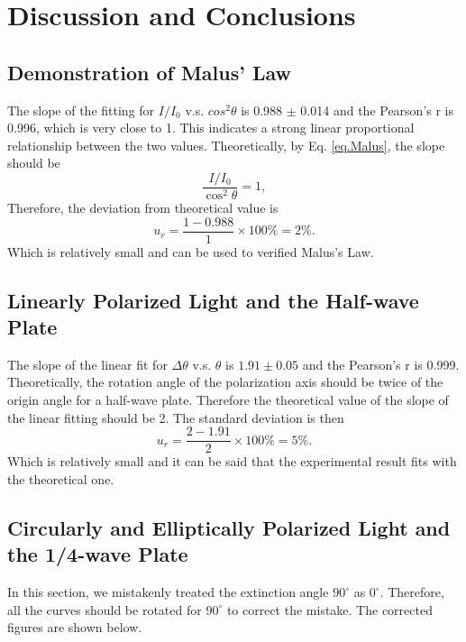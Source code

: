 \documentclass{article}
\begin{document}
\section{Discussion and Conclusions}

\subsection{Demonstration of Malus' Law}

The slope of the fitting for $I/I_0$ v.s. $cos^2\theta$ is 0.988 $\pm$ 0.014 and the Pearson's r is 0.996, which is very close to 1. This indicates a strong linear proportional relationship between the two values. Theoretically, by Eq. \ref{eq.Malus}, the slope should be
$$\frac{I/I_0}{\cos^2\theta} = 1,$$
Therefore, the deviation from theoretical value is
$$u_r = \frac{1-0.988}{1} \times 100\% = 2\%.$$
Which is relatively small and can be used to verified Malus's Law.

\subsection{Linearly Polarized Light and the Half-wave Plate}

The slope of the linear fit for $\Delta\theta$ v.s. $\theta$ is $1.91 \pm 0.05$ and the Pearson's r is 0.999. Theoretically, the rotation angle of the polarization axis should be twice of the origin angle for a half-wave plate. Therefore the theoretical value of the slope of the linear fitting should be 2. The standard deviation is then
$$u_r = \frac{2-1.91}{2}\times 100\% = 5\%.$$ 
Which is relatively small and it can be said that the experimental result fits with the theoretical one.

\subsection{Circularly and Elliptically Polarized Light and the 1/4-wave Plate}

In this section, we mistakenly treated the extinction angle $90^{\circ}$ as $0^{\circ}$. Therefore, all the curves should be rotated for $90^{\circ}$ to correct the mistake. The corrected figures are shown below.
\end{document}
